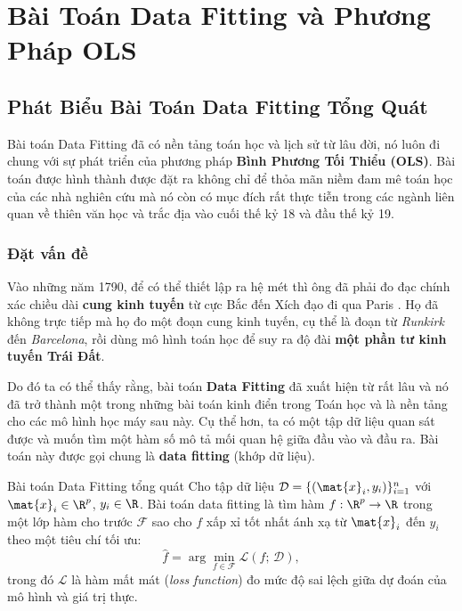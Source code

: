 ﻿\section{Bài Toán Data Fitting và Phương Pháp OLS}

\subsection{Phát Biểu Bài Toán Data Fitting Tổng Quát}
Bài toán Data Fitting đã có nền tảng toán học và lịch sử từ lâu đời, nó luôn đi chung với sự phát triển của phương pháp \textbf{Bình Phương Tối Thiểu (OLS)}. Bài toán được hình thành được đặt ra không chỉ để thỏa mãn niềm đam mê toán học của các nhà nghiên cứu mà nó còn có mục đích rất thực tiễn trong các ngành liên quan về thiên văn học và trắc địa vào cuối thế kỷ 18 và đầu thế kỷ 19.
\subsubsection{Đặt vấn đề}
Vào những năm 1790, để có thể thiết lập ra hệ mét  thì ông đã phải đo đạc chính xác chiều dài \textbf{cung kinh tuyến} từ cực Bắc đến Xích đạo đi qua Paris \cite{stigler1996}. Họ đã không trực tiếp mà họ đo một đoạn cung kinh tuyến, cụ thể là đoạn từ \textit{Runkirk} đến \textit{Barcelona}, rồi dùng mô hình toán học để suy ra độ đài \textbf{một phần tư kinh tuyến Trái Đất}.

Do đó ta có thể thấy rằng, bài toán \textbf{Data Fitting} đã xuất hiện từ rất lâu và nó đã trở thành một trong những bài toán kinh điển trong Toán học và là nền tảng cho các mô hình học máy sau này. Cụ thể hơn, ta có một tập dữ liệu quan sát được
và muốn tìm một hàm số mô tả mối quan hệ giữa đầu vào và đầu ra. Bài toán này
được gọi chung là \textbf{data fitting} (khớp dữ liệu).

\begin{mydef}{Bài toán Data Fitting tổng quát}{}
Cho tập dữ liệu $\mathcal{D} = \{(\mat{x}_i, y_i)\}_{i=1}^n$ với
$\mat{x}_i \in \R^p$, $y_i \in \R$. Bài toán data fitting là tìm hàm
$f : \R^p \to \R$ trong một lớp hàm cho trước $\mathcal{F}$ sao cho
$f$ xấp xỉ tốt nhất ánh xạ từ $\mat{x}_i$ đến $y_i$ theo một tiêu chí tối ưu:
\[
    \hat{f} = \arg\min_{f \in \mathcal{F}} \mathcal{L}(f;\, \mathcal{D}),
\]
trong đó $\mathcal{L}$ là hàm mất mát (\textit{loss function}) đo mức độ sai lệch
giữa dự đoán của mô hình và giá trị thực.
\end{mydef}

